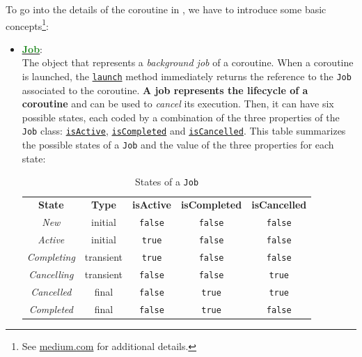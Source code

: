 To go into the details of the coroutine in \Kotlin, we have to introduce some basic concepts\footnote{See \href{https://medium.com/mobile-app-development-publication/kotlin-coroutine-scope-context-and-job-made-simple-5adf89fcfe94}{medium.com} for additional details.}:
\begin{itemize}
	\item \href{https://kotlinlang.org/api/kotlinx.coroutines/kotlinx-coroutines-core/kotlinx.coroutines/-job/}{\underline{\textbf{\textcolor{ForestGreen}{Job}}}}:\\
	The object that represents a \textit{background job} of a coroutine. When a coroutine is launched, the \href{https://kotlinlang.org/api/kotlinx.coroutines/kotlinx-coroutines-core/kotlinx.coroutines/launch.html}{\texttt{launch}} method immediately returns the reference to the \texttt{Job} associated to the coroutine. \textbf{A job represents the lifecycle of a coroutine} and can be used to \textit{cancel} its execution. Then, it can have six possible states, each coded by a combination of the three properties of the \texttt{Job} class: \href{https://kotlinlang.org/api/kotlinx.coroutines/kotlinx-coroutines-core/kotlinx.coroutines/-job/is-active.html}{\texttt{isActive}}, \href{https://kotlinlang.org/api/kotlinx.coroutines/kotlinx-coroutines-core/kotlinx.coroutines/-job/is-completed.html}{\texttt{isCompleted}} and \href{https://kotlinlang.org/api/kotlinx.coroutines/kotlinx-coroutines-core/kotlinx.coroutines/-job/is-cancelled.html}{\texttt{isCancelled}}.
	This table summarizes the possible states of a \texttt{Job} and the value of the three properties for each state:
	\begin{table}[h!]
		\centering
		\begin{tabular}{ccccc}
			\textbf{State} & \textbf{Type} & \textbf{isActive} & \textbf{isCompleted} & \textbf{isCancelled} \\
			\textit{New}        & initial   & \texttt{false} & \texttt{false} & \texttt{false} \\
			\textit{Active}     & initial   & \texttt{true}  & \texttt{false} & \texttt{false} \\
			\textit{Completing} & transient & \texttt{true}  & \texttt{false} & \texttt{false} \\
			\textit{Cancelling} & transient & \texttt{false} & \texttt{false} & \texttt{true}  \\
			\textit{Cancelled}  & final     & \texttt{false} & \texttt{true}  & \texttt{true}  \\
			\textit{Completed}  & final     & \texttt{false} & \texttt{true}  & \texttt{false}
		\end{tabular}
		\caption{States of a \texttt{Job}}
		\label{tab:job_states}
	\end{table}


\end{itemize}

